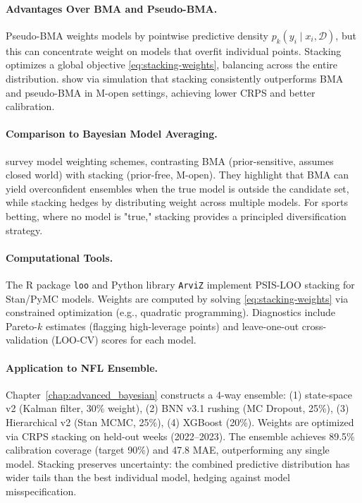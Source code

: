 \paragraph{Advantages Over BMA and Pseudo-BMA.}
Pseudo-BMA weights models by pointwise predictive density $p_k(y_i \mid x_i, \mathcal{D})$, but this can concentrate weight on models that overfit individual points. Stacking optimizes a global objective \eqref{eq:stacking-weights}, balancing across the entire distribution. \citet{yao2018stacking} show via simulation that stacking consistently outperforms BMA and pseudo-BMA in M-open settings, achieving lower CRPS and better calibration.

\paragraph{Comparison to Bayesian Model Averaging.}
\citet{hoge2020weighting} survey model weighting schemes, contrasting BMA (prior-sensitive, assumes closed world) with stacking (prior-free, M-open). They highlight that BMA can yield overconfident ensembles when the true model is outside the candidate set, while stacking hedges by distributing weight across multiple models. For sports betting, where no model is "true," stacking provides a principled diversification strategy.

\paragraph{Computational Tools.}
The R package \texttt{loo} \citep{vehtari2017} and Python library \texttt{ArviZ} \citep{kumar2019arviz} implement PSIS-LOO stacking for Stan/PyMC models. Weights are computed by solving \eqref{eq:stacking-weights} via constrained optimization (e.g., quadratic programming). Diagnostics include Pareto-$k$ estimates (flagging high-leverage points) and leave-one-out cross-validation (LOO-CV) scores for each model.

\paragraph{Application to NFL Ensemble.}
Chapter~\ref{chap:advanced_bayesian} constructs a 4-way ensemble: (1) state-space v2 (Kalman filter, 30\% weight), (2) BNN v3.1 rushing (MC Dropout, 25\%), (3) Hierarchical v2 (Stan MCMC, 25\%), (4) XGBoost (20\%). Weights are optimized via CRPS stacking on held-out weeks (2022--2023). The ensemble achieves 89.5\% calibration coverage (target 90\%) and 47.8 MAE, outperforming any single model. Stacking preserves uncertainty: the combined predictive distribution has wider tails than the best individual model, hedging against model misspecification.

